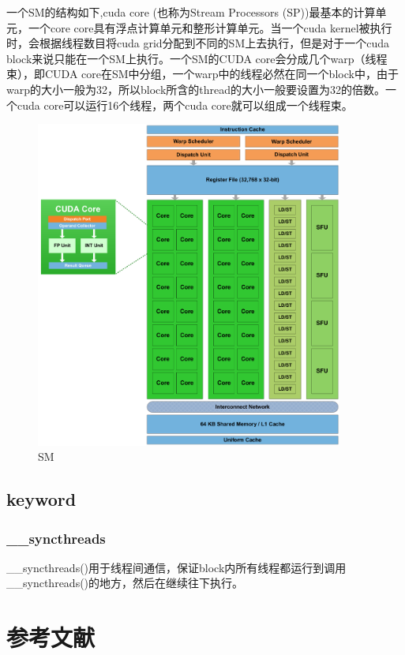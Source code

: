 \documentclass[12pt]{book}
\begin{document}
一个SM的结构如下,cuda core (也称为Stream Processors (SP))最基本的计算单元，一个core core具有浮点计算单元和整形计算单元。当一个cuda kernel被执行时，会根据线程数目将cuda grid分配到不同的SM上去执行，但是对于一个cuda block来说只能在一个SM上执行。一个SM的CUDA core会分成几个warp（线程束），即CUDA core在SM中分组，一个warp中的线程必然在同一个block中，由于warp的大小一般为32，所以block所含的thread的大小一般要设置为32的倍数。一个cuda core可以运行16个线程，两个cuda core就可以组成一个线程束。
\begin{figure}[H]
	\centering
	\includegraphics[width=0.9\textwidth]{images/cuda-one-sm.png}
	\caption{SM}
	\label{SM}
\end{figure}

\section{keyword}
\subsection{\_\_syncthreads}
\_\_syncthreads()用于线程间通信，保证block内所有线程都运行到调用\_\_syncthreads()的地方，然后在继续往下执行。
\newpage
 
\fancyhead{}
 

 
\chapter{参考文献}


 
\end{document}
